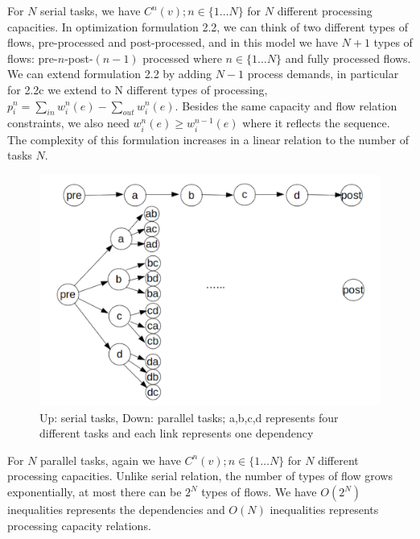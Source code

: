 For $N$ serial tasks, we have $C^n(v); n\in\{1\dots N\}$ for $N$ different processing capacities. In optimization formulation 2.2, we can think of two different types of flows, pre-processed and post-processed, and in this model we have $N+1$ types of flows: pre-$n$-post-$(n-1)$ processed where $ n\in\{1\dots N\}$ and  fully processed flows. We can extend formulation 2.2 by adding $N-1$ process demands, in particular for 2.2c we extend to N different types of processing, $p_i^n= \sum\limits_{in} w_i^n(e) - \sum\limits_{out} w_i^n(e)$. Besides the same capacity and flow relation constraints, we also need $w_i^n(e) \geq w_i^{n-1}(e)$ where it reflects the sequence. The complexity of this formulation increases in a linear relation to the number of tasks $N$.
\begin{figure}
 \includegraphics[width=\linewidth]{task.png}
 \caption{Up: serial tasks, Down: parallel tasks; a,b,c,d represents four different tasks and each link represents one dependency}
\end{figure}


For $N$ parallel tasks, again we have $C^n(v); n\in\{1\dots N\}$ for $N$ different processing capacities. Unlike serial relation, the number of types of flow grows exponentially, at most there can be $2^N$ types of flows. We have $O(2^N)$ inequalities represents the dependencies and $O(N)$ inequalities represents processing capacity relations.

